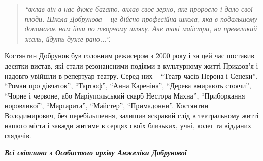 \begin{quote}
\em\enquote{вклав він в нас дуже багато. вклав своє зерно, яке проросло
і дало свої плоди. Школа Добрунова – це дійсно професійна школа, яка в
подальшому допомагає нам йти по творчому шляху. Але такі майстри, на превеликий
жаль, йдуть дуже рано...}. 
\end{quote}

Костянтин Добрунов був головним режисером з 2000 року і за цей час поставив
десятки вистав, які стали резонансними подіями в культурному житті Приазов’я і
надовго увійшли в репертуар театру. Серед них – \enquote{Театр часів Нерона і Сенеки},
\enquote{Роман про дівчаток}, \enquote{Тартюф}, \enquote{Анна Кареніна}, \enquote{Дерева вмирають стоячи},
\enquote{Чорне і червоне, або Маріупольський скарб Нестора Махна}, \enquote{Приборкання
норовливої}, \enquote{Маргарита}, \enquote{Майстер}, \enquote{Примадонни}. Костянтин Володимирович, без
перебільшення, залишив яскравий слід в театральному житті нашого міста і завжди
житиме  в серцях своїх близьких, учні, колег та відданих глядачів.

\textbf{\emph{Всі світлини з Особистого архіву Анжеліки Добрунової}}
